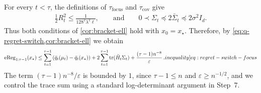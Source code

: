 \documentclass[12pt,cleveref]{jmlr}
\newcommand{\ineqlabel}[1]{\label[inequality]{#1}}
\newcommand{\tr}{\operatorname{tr}}
\newcommand{\1}{\mathbf 1}
\newcommand{\eps}{\varepsilon}
\begin{document}
For every $t<\tau$, the definitions of $\tau_{\mathrm{focus}}$ and
$\tau_{\mathrm{cov}}$ give
\begin{align}
    \frac12 R_t^2 \leq \frac{1}{128^2\lambda^2\ell},
    \qquad\text{and}\qquad
    0 \prec \Sigma_t \preceq 2\bar{\Sigma}_t \preceq 2\sigma^2 I_d.
\end{align}
Thus both conditions of \cref{cor:bracket-ell} hold with $x_0=x_\star$.
Therefore, by \cref{eq:q-regret-switch,cor:bracket-ell} we obtain
\begin{align}
    \operatorname{eReg}_{1:\tau -1}(x_{\star})
    \leq
    \sum_{t=1}^{\tau -1}
    \left(\bar{q}_t(\mu_t)-\bar{q}_t(x_{\star})\right)
    +
    2\sum_{t=1}^{\tau -1}
    \tr(\bar{H}_t\Sigma_t)
    +\frac{(\tau -1) n^{-8}}{\eps}\,.
    \ineqlabel{eq:regret-switch-focus}
\end{align}
The term $(\tau-1)n^{-8}/\eps$ is bounded by $1$, since
$\tau-1\leq n$ and $\eps\geq n^{-1/2}$, and we control the trace sum
using a standard log-determinant argument in Step~7.
\end{document}
